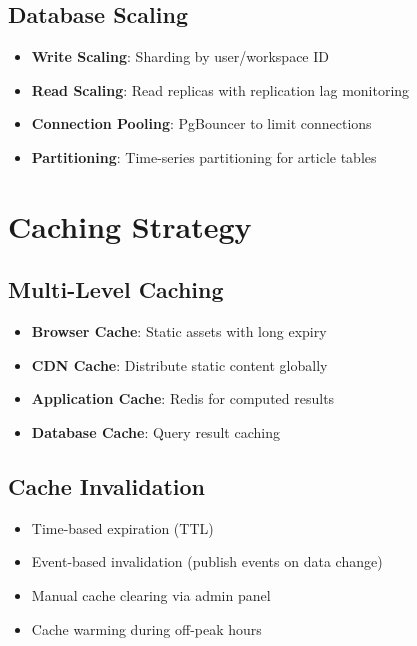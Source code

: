 \documentclass[12pt,a4paper]{report}
\begin{document}
\subsection{Database Scaling}

\begin{itemize}[label=\textbullet]
    \item \textbf{Write Scaling}: Sharding by user/workspace ID
    \item \textbf{Read Scaling}: Read replicas with replication lag monitoring
    \item \textbf{Connection Pooling}: PgBouncer to limit connections
    \item \textbf{Partitioning}: Time-series partitioning for article tables
\end{itemize}

\section{Caching Strategy}

\subsection{Multi-Level Caching}

\begin{itemize}[label=\textbullet]
    \item \textbf{Browser Cache}: Static assets with long expiry
    \item \textbf{CDN Cache}: Distribute static content globally
    \item \textbf{Application Cache}: Redis for computed results
    \item \textbf{Database Cache}: Query result caching
\end{itemize}

\subsection{Cache Invalidation}

\begin{itemize}[label=\textbullet]
    \item Time-based expiration (TTL)
    \item Event-based invalidation (publish events on data change)
    \item Manual cache clearing via admin panel
    \item Cache warming during off-peak hours
\end{itemize}
\end{document}
